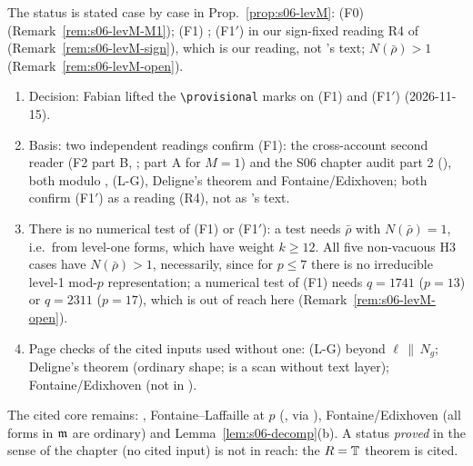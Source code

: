 \begin{remark}\label{rem:s06-levM-status}
The status is stated case by case in Prop.~\ref{prop:s06-levM}: (F0) \stpmc{} (Remark~\ref{rem:s06-levM-M1}); (F1) \stpmc; (F1$'$) \stpmc{} in
our sign-fixed reading R4 of \cite[Thm~3.14]{KO} (Remark~\ref{rem:s06-levM-sign}), which is our reading, not \cite{KO}'s text; $N(\bar\rho)>1$
\stopen{} (Remark~\ref{rem:s06-levM-open}).
\begin{enumerate}[label=(\roman*)]
\item Decision: Fabian lifted the \verb|\provisional| marks on (F1) and (F1$'$) (2026-11-15).
\item Basis: two independent readings confirm (F1): the cross-account second reader (F2 part B,
  ; part A for $M=1$) and the S06 chapter audit part 2
  (), both modulo \cite[Thm~3.14]{KO}, (L-G), Deligne's theorem and
  Fontaine/Edixhoven; both confirm (F1$'$) as a reading (R4), not as \cite{KO}'s text.
\item There is no numerical test of (F1) or (F1$'$): a test needs $\bar\rho$ with $N(\bar\rho)=1$, i.e.\ from level-one forms, which have
  weight $k\ge12$. All five non-vacuous H3 cases have $N(\bar\rho)>1$, necessarily, since for $p\le7$ there is no irreducible
  level-1 mod-$p$ representation; a numerical test of (F1) needs $q=1741$ ($p=13$) or $q=2311$ ($p=17$), which is out of reach here
  (Remark~\ref{rem:s06-levM-open}).
\item Page checks of the cited inputs used without one: (L-G) beyond $\ell\,\|\,N_g$; Deligne's theorem \cite[Thm~2.5]{Edi92} (ordinary shape; \cite{W88} is a scan without text
  layer); Fontaine/Edixhoven \cite[Thm~2.6]{Edi92} (not in ).
\end{enumerate}
The cited core remains: \cite[Thm~2.9, Lemma~2.4, Thm~3.14, Cor.~3.13, Lemmas~3.15--3.16]{KO}, Fontaine--Laffaille at $p$ (\cite[\S1.1.2]{DFG}, via
\cite{KO}), Fontaine/Edixhoven (all forms in $\mathfrak{m}$ are ordinary) and Lemma~\ref{lem:s06-decomp}(b). A status \emph{proved} in the sense of the
chapter (no cited input) is not in reach: the $R=\mathbb{T}$ theorem is cited.

\end{remark}


